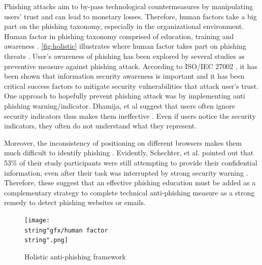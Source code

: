 Phishing attacks aim to by-pass technological countermeasures by manipulating
users\textquoteright{} trust and can lead to monetary losses. Therefore,
human factors take a big part on the phishing taxonomy, especially
in the organizational environment. Human factor in phishing taxonomy
comprised of education, training and awareness \citep{frauenstein:2013}.
\autoref{fig:holistic} illustrates where human factor takes part
on phishing threats \citep{frauenstein:2013}. User\textquoteright s
awareness of phishing has been explored by several studies \citep{james:2005,frauenstein:2013,emigh:2005,kumaraguru:2008,jansson:2013,dodge:2007}
as preventive measure against phishing attack. According to ISO/IEC
27002 \citep{frauenstein:2013}\citep{organization:2005}, it has
been shown that information security awareness is important and it
has been critical success factors to mitigate security vulnerabilities
that attack user\textquoteright s trust. One approach to hopefully
prevent phishing attack was by implementing anti phishing warning/indicator.
Dhamija, et al suggest that users often ignore security indicators
thus makes them ineffective \citep{dhamija2006phishing}. Even if
users notice the security indicators, they often do not understand
what they represent. 

Moreover, the inconsistency of positioning on different browsers makes
them much difficult to identify phishing \citep{kirlappos:2012}.
Evidently, Schechter, et al. pointed out that 53\% of their study
participants were still attempting to provide their confidential information,
even after their task was interrupted by strong security warning \citep{schechter:2007}.
Therefore, these suggest that an effective phishing education must
be added as a complementary strategy to complete technical anti-phishing
measure as a strong remedy to detect phishing websites or emails.

\begin{figure}


\begin{centering}
\texttt{[image: \\string"gfx/human factor\\string".png]}\protect\caption{\label{fig:holistic}Holistic anti-phishing framework \citep{frauenstein:2013}}

\par\end{centering}

\end{figure}


